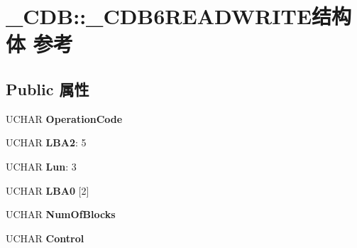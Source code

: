 \hypertarget{struct___c_d_b_1_1___c_d_b6_r_e_a_d_w_r_i_t_e}{}\section{\+\_\+\+C\+DB\+:\+:\+\_\+\+C\+D\+B6\+R\+E\+A\+D\+W\+R\+I\+T\+E结构体 参考}
\label{struct___c_d_b_1_1___c_d_b6_r_e_a_d_w_r_i_t_e}
\subsection*{Public 属性}
\begin{DoxyCompactItemize}
\item 
\mbox{\label{struct___c_d_b_1_1___c_d_b6_r_e_a_d_w_r_i_t_e_ad809a83832f886fc496be5c1c53873e3}} 
U\+C\+H\+AR {\bfseries Operation\+Code}
\item 
\mbox{\label{struct___c_d_b_1_1___c_d_b6_r_e_a_d_w_r_i_t_e_aa86db46e392bea14a2c27fa910bb5e39}} 
U\+C\+H\+AR {\bfseries L\+B\+A2}\+: 5
\item 
\mbox{\label{struct___c_d_b_1_1___c_d_b6_r_e_a_d_w_r_i_t_e_a557ebfec83d0e6c56af0a2bf371f5b51}} 
U\+C\+H\+AR {\bfseries Lun}\+: 3
\item 
\mbox{\label{struct___c_d_b_1_1___c_d_b6_r_e_a_d_w_r_i_t_e_ad5267e421b7b88dd1959d1affa10c0e8}} 
U\+C\+H\+AR {\bfseries L\+B\+A0} \mbox{[}2\mbox{]}
\item 
\mbox{\label{struct___c_d_b_1_1___c_d_b6_r_e_a_d_w_r_i_t_e_a60a12d8a22314de7df2c63438ca8a7cb}} 
U\+C\+H\+AR {\bfseries Num\+Of\+Blocks}
\item 
\mbox{\label{struct___c_d_b_1_1___c_d_b6_r_e_a_d_w_r_i_t_e_acff2e48b6fe0a04de61f8e3e73df0fc7}} 
U\+C\+H\+AR {\bfseries Control}
\item 
\mbox{\label{struct___c_d_b_1_1___c_d_b6_r_e_a_d_w_r_i_t_e_ad40b0f16de4672ea6f398ad36b85babf}} 

\end{DoxyCompactItemize}
